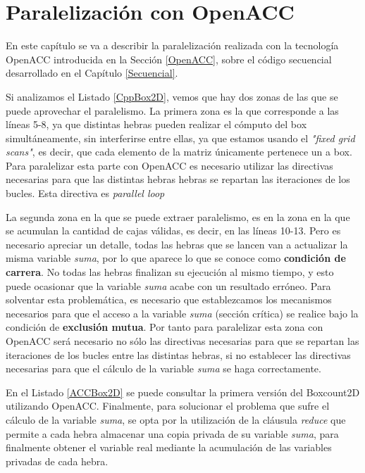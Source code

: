 \chapter{Paralelización con OpenACC}
\label{ParalelizacionOpenACC}
En este capítulo se va a describir la paralelización realizada con la tecnología OpenACC introducida en la Sección \ref{OpenACC}, sobre el código secuencial desarrollado en el Capítulo \ref{Secuencial}.

Si analizamos el Listado \ref{CppBox2D}, vemos que hay dos zonas de las que se puede aprovechar el paralelismo. La primera zona es la que corresponde a las líneas 5-8, ya que distintas hebras pueden realizar el cómputo del box simultáneamente, sin interferirse entre ellas, ya que estamos usando el \textit{"fixed grid scans"}, es decir, que cada elemento de la matriz únicamente pertenece un a box. Para paralelizar esta parte con OpenACC es necesario utilizar las directivas necesarias para que las distintas hebras hebras se repartan las iteraciones de los bucles. Esta directiva es \textit{parallel loop} 

La segunda zona en la que se puede extraer paralelismo, es en la zona en la que se acumulan la cantidad de cajas válidas, es decir, en las líneas 10-13. Pero es necesario apreciar un detalle, todas las hebras que se lancen van a actualizar la misma variable \textit{suma}, por lo que aparece lo que se conoce como \textbf{condición de carrera}. No todas las hebras finalizan su ejecución al mismo tiempo, y esto puede ocasionar que la variable \textit{suma} acabe con un resultado erróneo. Para solventar esta problemática, es necesario que establezcamos los mecanismos necesarios para que el acceso a la variable \textit{suma} (sección crítica) se realice bajo la condición de \textbf{exclusión mutua}. Por tanto para paralelizar esta zona con OpenACC será necesario no sólo las directivas necesarias para que se repartan las iteraciones de los bucles entre las distintas hebras, si no establecer las directivas necesarias para que el cálculo de la variable \textit{suma} se haga correctamente.

En el Listado \ref{ACCBox2D} se puede consultar la primera versión del Boxcount2D utilizando OpenACC. Finalmente, para solucionar el problema que sufre el cálculo de la variable \textit{suma}, se opta por la utilización de la cláusula \textit{reduce} que permite a cada hebra almacenar una copia privada de su variable \textit{suma}, para finalmente obtener el variable real mediante la acumulación de las variables privadas de cada hebra.


